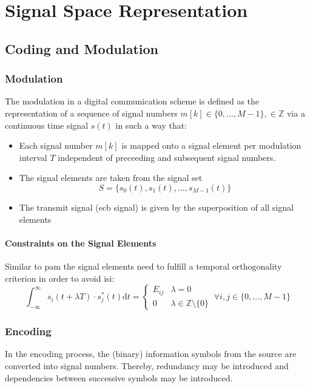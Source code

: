 \chapter{Signal Space Representation}
\section{Coding and Modulation}
\subsection{Modulation}
The modulation in a digital communication scheme is defined as the representation
of a sequence of signal numbers $m[k] \in \{0, \ldots, M-1\}, \in \mathbb{Z}$ via
a continuous time signal $s(t)$ in such a way that:
\begin{itemize}
    \item Each signal number $m[k]$ is mapped onto a signal element per modulation
        interval $T$ independent of preceeding and subsequent signal numbers.
    \item The signal elements are taken from the signal set
        \begin{equation}
            S = \{s_0(t), s_1(t), \ldots, s_{M-1}(t)\}
        \end{equation}
    \item The transmit signal (\ac{ecb} signal) is given by the superposition
        of all signal elements
\end{itemize}

\subsubsection{Constraints on the Signal Elements}
Similar to \ac{pam} the signal elements need to fulfill a temporal orthogonality
criterion in order to avoid \ac{isi}:
\begin{equation}
    \int_{-\infty}^\infty s_i(t + \lambda T) \cdot s_j^* (t) \text{d}t
    = \begin{cases}
        E_{ij} & \lambda = 0 \\
        0 & \lambda \in \mathbb{Z} \setminus \{0\} 
    \end{cases}
    \ \forall i, j \in \{0, \ldots, M-1\}
\end{equation}

\subsection{Encoding}
In the encoding process, the (binary) information symbols from the source are converted
into signal numbers. Thereby, redundancy may be introduced and dependencies between
successive symbols may be introduced.

